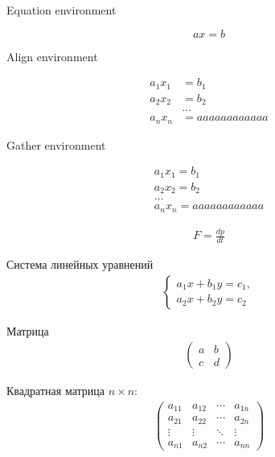    Equation environment

    \begin{equation}
    	ax = b
    \end{equation}

    Align environment

    \begin{align*}
    	a_1x_1 &= b_1 \\
    	a_2x_2 &= b_2 \\
    	&\dots        \\
    	a_nx_n &= aaaaaaaaaaaa
    \end{align*}

    \newpage

    Gather environment

    \begin{gather*}
    	a_1x_1 = b_1 \\
    	a_2x_2 = b_2 \\
    	\dots        \\
    	a_nx_n = aaaaaaaaaaaa
    \end{gather*}

    \begin{align*}
    \label{eq:3n}
    	F = \frac{dp}{dt} \tag{III ЗН}
    \end{align*}

    Система линейных уравнений
    \begin{align*}
    \begin{cases}
    	a_1x + b_1y = c_1, \\
    	a_2x + b_2y = c_2
    \end{cases}
    \end{align*}

    Матрица
    \begin{align*}
    \begin{pmatrix}
    	a & b \\
    	c & d
    \end{pmatrix}
    \end{align*}

    Квадратная матрица $ n \times n $:
    \begin{align*}
    \begin{pmatrix}
    	a_{11} & a_{12} & \cdots & a_{1n} \\
    	a_{21} & a_{22} & \cdots & a_{2n} \\
    	\vdots & \vdots & \ddots & \vdots \\
    	a_{n1} & a_{n2} & \cdots & a_{nn}
    \end{pmatrix}
    \end{align*}

